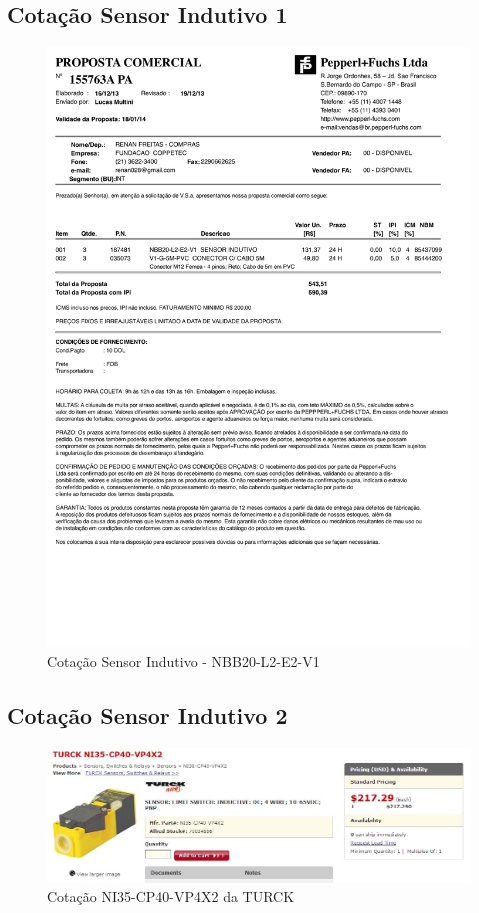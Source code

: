 \subsection{Cotação Sensor Indutivo 1 }
\begin{figure}[H]
 \centering
 \includegraphics[width=1\columnwidth]{Indutivo/price_quote_0.pdf}
 \caption{Cotação Sensor Indutivo - NBB20-L2-E2-V1 }
\end{figure}

\subsection{Cotação Sensor Indutivo 2 }
\begin{figure}[H]
 \centering
 \includegraphics[width=1\columnwidth]{Indutivo/price_quote_1}
 \caption{Cotação NI35-CP40-VP4X2 da TURCK}
\end{figure}

